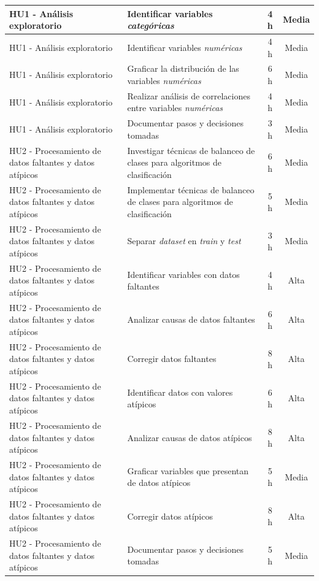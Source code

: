 \documentclass[
11pt, %
]{charter}
\begin{document}
\begin{xltabular}{\linewidth}{@{}|X|X|c|c|@{}}
HU1 - Análisis exploratorio & Identificar variables \textit{categóricas} & 4 h & Media \\ \hline
HU1 - Análisis exploratorio & Identificar variables \textit{numéricas} & 4 h & Media \\ \hline
HU1 - Análisis exploratorio & Graficar la distribución de las variables \textit{numéricas} & 6 h & Media \\ \hline
HU1 - Análisis exploratorio & Realizar análisis de correlaciones entre variables \textit{numéricas} & 4 h & Media \\ \hline
HU1 - Análisis exploratorio & Documentar pasos y decisiones tomadas & 3 h & Media \\ \hline
HU2 - Procesamiento de datos faltantes y datos atípicos & Investigar técnicas de balanceo de clases para algoritmos de clasificación & 6 h & Media \\ \hline
HU2 - Procesamiento de datos faltantes y datos atípicos & Implementar técnicas de balanceo de clases para algoritmos de clasificación & 5 h & Media \\ \hline
HU2 - Procesamiento de datos faltantes y datos atípicos & Separar \textit{dataset} en \textit{train} y \textit{test} & 3 h & Media \\ \hline
HU2 - Procesamiento de datos faltantes y datos atípicos & Identificar variables con datos faltantes & 4 h & Alta \\ \hline
HU2 - Procesamiento de datos faltantes y datos atípicos & Analizar causas de datos faltantes & 6 h & Alta \\ \hline
HU2 - Procesamiento de datos faltantes y datos atípicos & Corregir datos faltantes & 8 h & Alta \\ \hline
HU2 - Procesamiento de datos faltantes y datos atípicos & Identificar datos con valores atípicos & 6 h & Alta \\ \hline
HU2 - Procesamiento de datos faltantes y datos atípicos & Analizar causas de datos atípicos & 8 h & Alta \\ \hline
HU2 - Procesamiento de datos faltantes y datos atípicos & Graficar variables que presentan de datos atípicos & 5 h & Media \\ \hline
HU2 - Procesamiento de datos faltantes y datos atípicos & Corregir datos atípicos & 8 h & Alta \\ \hline
HU2 - Procesamiento de datos faltantes y datos atípicos & Documentar pasos y decisiones tomadas & 5 h & Media \\ \hline

\end{xltabular}
\end{document}
